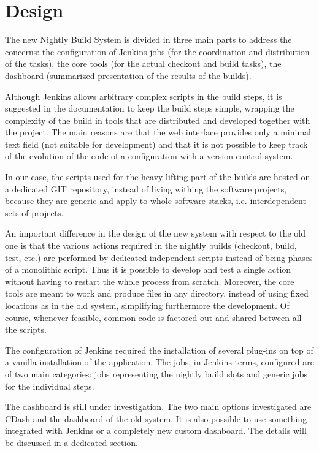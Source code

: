 \section{Design}
\label{sec:Design}
The new Nightly Build System is divided in three main parts to address the concerns: the
configuration of Jenkins jobs (for the coordination and distribution of the
tasks), the core tools (for the actual checkout and build tasks), the dashboard
(summarized presentation of the results of the builds).

Although Jenkins allows arbitrary complex scripts in the build steps, it is
suggested in the documentation to keep the build steps simple, wrapping the
complexity of the build in tools that are distributed and developed together
with the project.  The main reasons are that the web interface provides only a
minimal text field (not suitable for development) and that it is not possible to
keep track of the evolution of the code of a configuration with a version
control system.

In our case, the scripts used for the heavy-lifting part of the builds are
hosted on a dedicated GIT\cite{GIT} repository, instead of living withing the
software projects, because they are generic and apply to whole software stacks,
i.e. interdependent sets of projects.

An important difference in the design of the new system with respect to the old
one is that the various actions required in the nightly builds (checkout, build,
test, etc.) are performed by dedicated independent scripts instead of being
phases of a monolithic script.  Thus it is possible to develop and test a
single action without having to restart the whole process from scratch.
Moreover, the core tools are meant to work and produce files in any directory,
instead of using fixed locations as in the old system, simplifying furthermore
the development. Of course, whenever feasible, common code is factored out and
shared between all the scripts.

The configuration of Jenkins required the installation of several plug-ins on
top of a vanilla installation of the application.  The jobs, in Jenkins terms,
configured are of two main categories: jobs representing the nightly build slots
and generic jobs for the individual steps.

The dashboard is still under investigation.  The two main options investigated
are CDash\cite{CDash} and the dashboard of the old system.  It is also possible
to use something integrated with Jenkins or a completely new custom dashboard.
The details will be discussed in a dedicated section.
